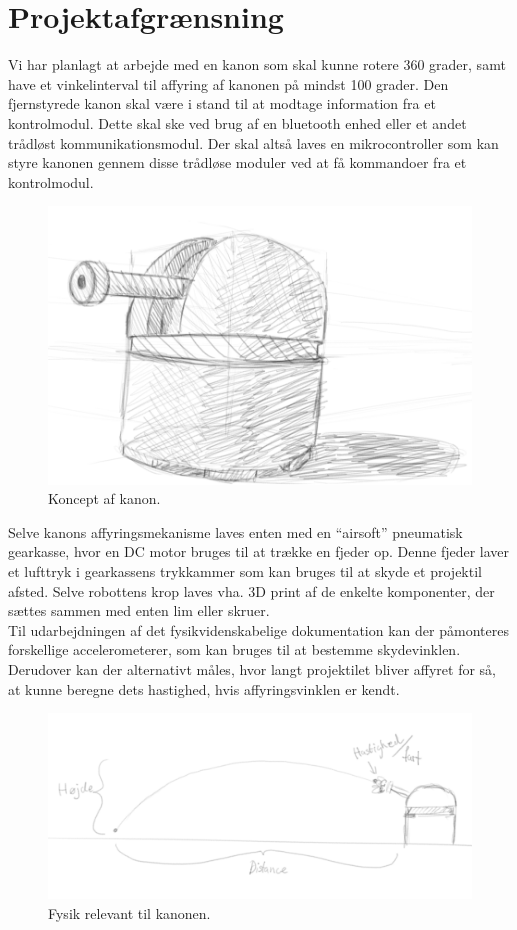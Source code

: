\section{Projektafgrænsning}

Vi har planlagt at arbejde med en kanon som skal kunne rotere 360 grader, samt have et vinkelinterval til affyring af kanonen på mindst 100 grader. Den fjernstyrede kanon skal være i stand til at modtage information fra et kontrolmodul. Dette skal ske ved brug af en bluetooth enhed eller et andet trådløst kommunikationsmodul. Der skal altså laves en mikrocontroller som kan styre kanonen gennem disse trådløse moduler ved at få kommandoer fra et kontrolmodul.\\

\begin{figure}[H]
\centering
\includegraphics[scale=0.4]{Billeder/Koncept_turret.png}
\caption{Koncept af kanon.}
\label{fig:KonceptKanon}
\end{figure}

Selve kanons affyringsmekanisme laves enten med en “airsoft” pneumatisk gearkasse, hvor en DC motor bruges til at trække en fjeder op. Denne fjeder laver et lufttryk i gearkassens trykkammer som kan bruges til at skyde et projektil afsted. Selve robottens krop laves vha. 3D print af de enkelte komponenter, der sættes sammen med enten lim eller skruer. \\

Til udarbejdningen af det fysikvidenskabelige dokumentation kan der påmonteres forskellige accelerometerer, som kan bruges til at bestemme skydevinklen. Derudover kan der alternativt måles, hvor langt projektilet bliver affyret for så, at kunne beregne dets hastighed, hvis affyringsvinklen er kendt.

\begin{figure}[H]
\centering
\includegraphics[scale=0.4]{Billeder/Fysik_koncept.png}
\caption{Fysik relevant til kanonen.}
\label{fig:FysikKoncept}
\end{figure}